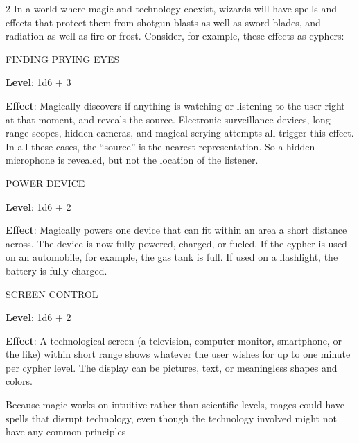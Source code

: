 \begin{multicols}{2}
In a world where magic and technology coexist, wizards will have spells and effects that protect them from shotgun blasts as well as sword blades, and radiation as well as fire or frost. Consider, for example, these effects as cyphers:

FINDING PRYING EYES 

\textbf{Level}: 1d6 + 3 

\textbf{Effect}: Magically discovers if anything is watching or listening to the user right at that moment, and reveals the source. Electronic surveillance devices, long-range scopes, hidden cameras, and magical scrying attempts all trigger this effect. In all these cases, the “source” is the nearest representation. So a hidden microphone is revealed, but not the location of the listener. 

POWER DEVICE 

\textbf{Level}: 1d6 + 2 

\textbf{Effect}: Magically powers one device that can fit within an area a short distance across. The device is now fully powered, charged, or fueled. If the cypher is used on an automobile, for example, the gas tank is full. If used on a flashlight, the battery is fully charged. 

SCREEN CONTROL 

\textbf{Level}: 1d6 + 2 

\textbf{Effect}: A technological screen (a television, computer monitor, smartphone, or the like) within short range shows whatever the user wishes for up to one minute per cypher level. The display can be pictures, text, or meaningless shapes and colors.

Because magic works on intuitive rather than scientific levels, mages could have spells that disrupt technology, even though the technology involved might not have any common principles


\end{multicols}
